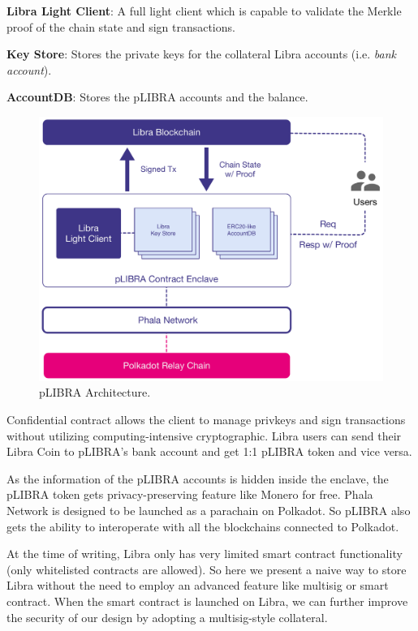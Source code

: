 \begin{icompact}
    \item \textbf{Libra Light Client}: A full light client which is capable to validate the Merkle proof of the chain state and sign transactions.
    \item \textbf{Key Store}: Stores the private keys for the collateral Libra accounts (i.e. \textit{bank account}).
    \item \textbf{AccountDB}: Stores the pLIBRA accounts and the balance.
\end{icompact}

\begin{figure}
    \centering \footnotesize
    \includegraphics[width=.7\columnwidth]{img/pLIBRA-contract}
    \caption{pLIBRA Architecture.}
    \label{fig:plibra}
\end{figure}

Confidential contract allows the client to manage privkeys and sign transactions without utilizing computing-intensive cryptographic. Libra users can send their Libra Coin to pLIBRA's bank account and get 1:1 pLIBRA token and vice versa.

As the information of the pLIBRA accounts is hidden inside the enclave, the pLIBRA token gets privacy-preserving feature like Monero for free. Phala Network is designed to be launched as a parachain on Polkadot. So pLIBRA also gets the ability to interoperate with all the blockchains connected to Polkadot.

At the time of writing, Libra only has very limited smart contract functionality (only whitelisted contracts are allowed). So here we present a naive way to store Libra without the need to employ an advanced feature like multisig or smart contract. When the smart contract is launched on Libra, we can further improve the security of our design by adopting a multisig-style collateral.

